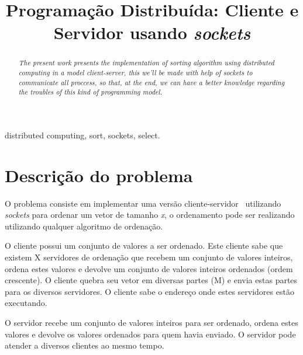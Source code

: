 \documentclass[portuguese, conference]{IEEEtran}
\begin{document}
\title{Programação Distribuída: Cliente e Servidor usando \it{sockets}}

\author{
}

\maketitle

\begin{abstract}
\it{The present work presents the implementation of sorting algorithm using distributed computing in a model client-server, this we'll be made with help of sockets to communicate all proccess, so that, at the end, we can have a better knowledge regarding the troubles of this kind of programming model.}
\end{abstract}

\begin{IEEEkeywords}
distributed computing, sort, sockets, select.
\end{IEEEkeywords}
\IEEEpeerreviewmaketitle

\section{Descrição do problema}

O problema consiste em implementar uma versão cliente-servidor~\cite{SPR05} utilizando {\it sockets} para ordenar um vetor de tamanho {\it x}, o ordenamento pode ser realizando utilizando qualquer algoritmo de ordenação.

O cliente possui um conjunto de valores a ser ordenado. Este cliente sabe que existem X servidores de ordenação que recebem um conjunto de valores inteiros, ordena estes valores e devolve um conjunto de valores inteiros ordenados (ordem crescente). O cliente quebra seu vetor em diversas partes (M) e envia estas partes para os diversos servidores. O cliente sabe o endereço onde estes servidores estão executando. 

O servidor recebe um conjunto de valores inteiros para ser ordenado, ordena estes valores e devolve os valores ordenados para quem havia enviado. O servidor pode atender a diversos clientes ao mesmo tempo.
\end{document}
